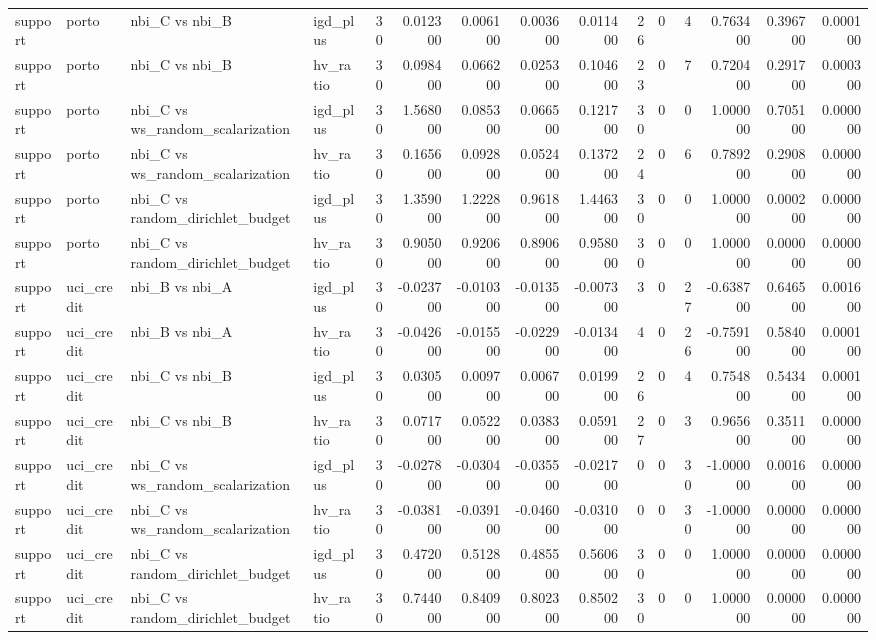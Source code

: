 \begin{landscape}
\begin{longtable}{llllrrrrrrrrrrr}
support & porto & nbi\_C vs nbi\_B & igd\_plus & 30 & 0.012300 & 0.006100 & 0.003600 & 0.011400 & 26 & 0 & 4 & 0.763400 & 0.396700 & 0.000100 \\
support & porto & nbi\_C vs nbi\_B & hv\_ratio & 30 & 0.098400 & 0.066200 & 0.025300 & 0.104600 & 23 & 0 & 7 & 0.720400 & 0.291700 & 0.000300 \\
support & porto & nbi\_C vs ws\_random\_scalarization & igd\_plus & 30 & 1.568000 & 0.085300 & 0.066500 & 0.121700 & 30 & 0 & 0 & 1.000000 & 0.705100 & 0.000000 \\
support & porto & nbi\_C vs ws\_random\_scalarization & hv\_ratio & 30 & 0.165600 & 0.092800 & 0.052400 & 0.137200 & 24 & 0 & 6 & 0.789200 & 0.290800 & 0.000000 \\
support & porto & nbi\_C vs random\_dirichlet\_budget & igd\_plus & 30 & 1.359000 & 1.222800 & 0.961800 & 1.446300 & 30 & 0 & 0 & 1.000000 & 0.000200 & 0.000000 \\
support & porto & nbi\_C vs random\_dirichlet\_budget & hv\_ratio & 30 & 0.905000 & 0.920600 & 0.890600 & 0.958000 & 30 & 0 & 0 & 1.000000 & 0.000000 & 0.000000 \\
support & uci\_credit & nbi\_B vs nbi\_A & igd\_plus & 30 & -0.023700 & -0.010300 & -0.013500 & -0.007300 & 3 & 0 & 27 & -0.638700 & 0.646500 & 0.001600 \\
support & uci\_credit & nbi\_B vs nbi\_A & hv\_ratio & 30 & -0.042600 & -0.015500 & -0.022900 & -0.013400 & 4 & 0 & 26 & -0.759100 & 0.584000 & 0.000100 \\
support & uci\_credit & nbi\_C vs nbi\_B & igd\_plus & 30 & 0.030500 & 0.009700 & 0.006700 & 0.019900 & 26 & 0 & 4 & 0.754800 & 0.543400 & 0.000100 \\
support & uci\_credit & nbi\_C vs nbi\_B & hv\_ratio & 30 & 0.071700 & 0.052200 & 0.038300 & 0.059100 & 27 & 0 & 3 & 0.965600 & 0.351100 & 0.000000 \\
support & uci\_credit & nbi\_C vs ws\_random\_scalarization & igd\_plus & 30 & -0.027800 & -0.030400 & -0.035500 & -0.021700 & 0 & 0 & 30 & -1.000000 & 0.001600 & 0.000000 \\
support & uci\_credit & nbi\_C vs ws\_random\_scalarization & hv\_ratio & 30 & -0.038100 & -0.039100 & -0.046000 & -0.031000 & 0 & 0 & 30 & -1.000000 & 0.000000 & 0.000000 \\
support & uci\_credit & nbi\_C vs random\_dirichlet\_budget & igd\_plus & 30 & 0.472000 & 0.512800 & 0.485500 & 0.560600 & 30 & 0 & 0 & 1.000000 & 0.000000 & 0.000000 \\
support & uci\_credit & nbi\_C vs random\_dirichlet\_budget & hv\_ratio & 30 & 0.744000 & 0.840900 & 0.802300 & 0.850200 & 30 & 0 & 0 & 1.000000 & 0.000000 & 0.000000 \\
\end{longtable}\endgroup

\end{landscape}
